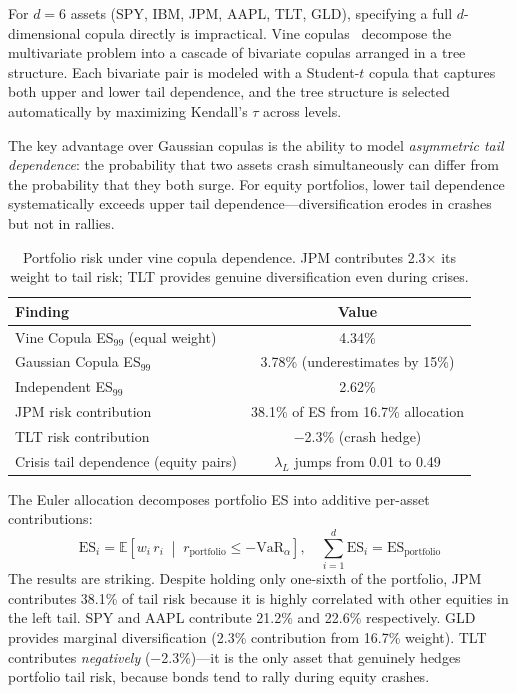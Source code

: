 \documentclass[11pt,a4paper]{article}
\begin{document}
For $d = 6$ assets (SPY, IBM, JPM, AAPL, TLT, GLD), specifying a full $d$-dimensional copula directly is impractical. Vine copulas~\cite{aas2009} decompose the multivariate problem into a cascade of bivariate copulas arranged in a tree structure. Each bivariate pair is modeled with a Student-$t$ copula that captures both upper and lower tail dependence, and the tree structure is selected automatically by maximizing Kendall's $\tau$ across levels.

The key advantage over Gaussian copulas is the ability to model \textit{asymmetric tail dependence}: the probability that two assets crash simultaneously can differ from the probability that they both surge. For equity portfolios, lower tail dependence systematically exceeds upper tail dependence---diversification erodes in crashes but not in rallies.

\begin{table}[H]
\centering
\begin{tabular}{lc}
\toprule
\textbf{Finding} & \textbf{Value} \\
\midrule
Vine Copula ES$_{99}$ (equal weight)          & 4.34\% \\
Gaussian Copula ES$_{99}$                     & 3.78\% (underestimates by 15\%) \\
Independent ES$_{99}$                         & 2.62\% \\
JPM risk contribution                         & 38.1\% of ES from 16.7\% allocation \\
TLT risk contribution                         & $-$2.3\% (crash hedge) \\
Crisis tail dependence (equity pairs)         & $\lambda_L$ jumps from 0.01 to 0.49 \\
\bottomrule
\end{tabular}
\caption{Portfolio risk under vine copula dependence. JPM contributes 2.3$\times$ its weight to tail risk; TLT provides genuine diversification even during crises.}
\label{tab:copula}
\end{table}

The Euler allocation decomposes portfolio ES into additive per-asset contributions:
\begin{equation}
\text{ES}_i = \mathbb{E}\!\left[ w_i\, r_i \;\middle|\; r_{\text{portfolio}} \leq -\text{VaR}_\alpha \right], \quad \sum_{i=1}^{d} \text{ES}_i = \text{ES}_{\text{portfolio}}
\end{equation}
The results are striking. Despite holding only one-sixth of the portfolio, JPM contributes 38.1\% of tail risk because it is highly correlated with other equities in the left tail. SPY and AAPL contribute 21.2\% and 22.6\% respectively. GLD provides marginal diversification (2.3\% contribution from 16.7\% weight). TLT contributes \textit{negatively} ($-$2.3\%)---it is the only asset that genuinely hedges portfolio tail risk, because bonds tend to rally during equity crashes.
\end{document}
